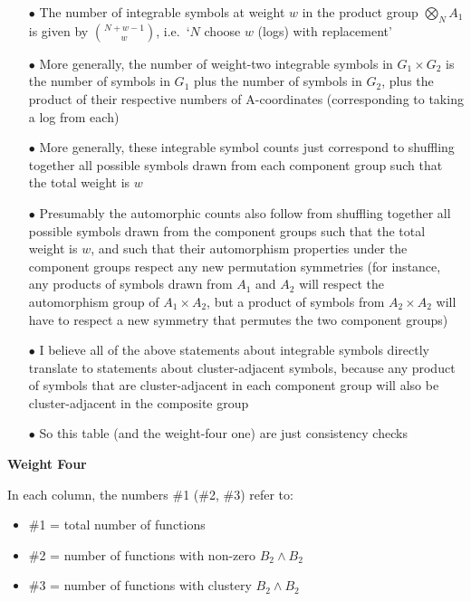 \documentclass[12pt]{article}
\begin{document}
\begin{center}
\begin{enumerate}
\item[$\bullet$] The number of integrable symbols at weight $w$ in the product group $\bigotimes_N A_1$ is given by $\binom{N+w-1}{w}$, i.e.\ `$N$ choose $w$ (logs) with replacement' 
\item[$\bullet$] More generally, the number of weight-two integrable symbols in $G_1 \times G_2$ is the number of symbols in $G_1$ plus the number of symbols in $G_2$, plus the product of their respective numbers of A-coordinates (corresponding to taking a log from each)
\item[$\bullet$] More generally, these integrable symbol counts just correspond to shuffling together all possible symbols drawn from each component group such that the total weight is $w$
\item[$\bullet$] Presumably the automorphic counts also follow from shuffling together all possible symbols drawn from the component groups such that the total weight is $w$, and such that their automorphism properties under the component groups respect any new permutation symmetries (for instance, any products of symbols drawn from $A_1$ and $A_2$ will respect the automorphism group of $A_1 \times A_2$, but a product of symbols from $A_2 \times A_2$ will have to respect a new symmetry that permutes the two component groups)
\item[$\bullet$] I believe all of the above statements about integrable symbols directly translate to statements about cluster-adjacent symbols, because any product of symbols that are cluster-adjacent in each component group will also be cluster-adjacent in the composite group
\item[$\bullet$] So this table (and the weight-four one) are just consistency checks
\end{enumerate}


\newpage

{\bf Weight Four}\\
\end{center}
In each column, the numbers \#1 (\#2, \#3) refer to:
\begin{itemize}
	\item \#1 = total number of functions
	\item \#2 = number of functions with non-zero $B_2 \wedge B_2$
	\item \#3 = number of functions with clustery $B_2 \wedge B_2$
\end{itemize}
\end{document}
